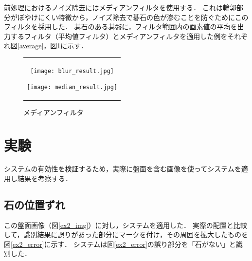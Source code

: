 \documentclass[summary]{nitocs}
\numberwithin{equation}{section}
\begin{document}
        前処理におけるノイズ除去にはメディアンフィルタを使用する．
        これは輪郭部分がぼやけにくい特徴から，ノイズ除去で碁石の色が滲むことを防ぐためにこのフィルタを採用した．
        碁石のある碁盤に，フィルタ範囲内の画素値の平均を出力するフィルタ（平均値フィルタ）とメディアンフィルタを適用した例をそれぞれ図\ref{average}，図\ref{median}に示す．
        \begin{figure}[tb] %
            \begin{center}
              \begin{tabular}{c}
                \begin{minipage}{0.5\hsize}
                  \begin{center}
                    \texttt{[image: blur\_result.jpg]}
                \caption{平均値フィルタ}
                \label{average}
                  \end{center}
                \end{minipage}
                \begin{minipage}{0.5\hsize}
                  \begin{center}
                    \texttt{[image: median\_result.jpg]}
                \caption{メディアンフィルタ}
                \label{median}
                  \end{center}
                \end{minipage}
              \end{tabular}
            \end{center}
        \end{figure}



    \section{実験} \label{experiment}
        システムの有効性を検証するため，実際に盤面を含む画像を使ってシステムを適用し結果を考察する．
        \subsection{石の位置ずれ} \label{ex2}%
            この盤面画像（図\ref{ex2_img}）に対し，システムを適用した．
            実際の配置と比較して，識別結果に誤りがあった部分にマークを付け，その周囲を拡大したものを図\ref{ex2_error}に示す．
            システムは図\ref{ex2_error}の誤り部分を「石がない」と識別した．
\end{document}
